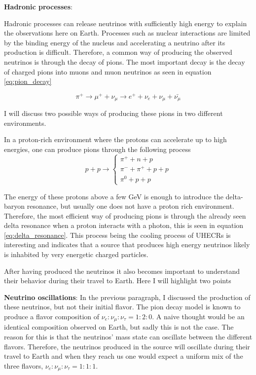 \textbf{Hadronic processes}:

Hadronic processes can release neutrinos with sufficiently high energy to explain the observations here on Earth. 
Processes such as nuclear interactions are limited by the binding energy of the nucleus and accelerating a neutrino after its production is difficult.
Therefore, a common way of producing the observed neutrinos is through the decay of pions. The most important decay is the decay of charged pions into muons and muon neutrinos as seen in equation \ref{eq:pion_decay}


\begin{equation}
    \pi^+ \rightarrow \mu^+ + \nu_\mu \rightarrow e^+ + \nu_e + \nu_\mu + \bar{\nu_\mu}
    \label{eq:pion_decay}
\end{equation}

I will discuss two possible ways of producing these pions in two different environments. 


In a proton-rich environment where the protons can accelerate up to high energies, one can produce pions through the following process
\begin{equation}
    p + p \rightarrow \begin{cases}
        \pi^+ + n+ p \\
        \pi^- + \pi^+ +p + p  \\
        \pi^0 + p+p
    \end{cases}
\end{equation}

The energy of these protons above a few GeV is enough to introduce the delta-baryon resonance, but usually one does not have a proton rich environment.
Therefore, the most efficient way of producing pions is through the already seen delta resonance when a proton interacts with a photon, this is seen in equation \ref{eq:delta_resonance}.
This process being the cooling process of UHECRs is interesting and indicates that a source that produces high energy neutrinos likely is inhabited by very energetic charged particles. 

After having produced the neutrinos it also becomes important to understand their behavior during their travel to Earth. Here I will highlight two points


\textbf{Neutrino oscillations}:
In the previous paragraph, I discussed the production of these neutrinos, but not their initial flavor.
The pion decay model is known to produce a flavor composition of $\nu_e : \nu_\mu : \nu_\tau = 1:2:0$. 
A naive thought would be an identical composition observed on Earth, but sadly this is not the case. 
The reason for this is that the neutrinos' mass state can oscillate between the different flavors. Therefore, the neutrinos produced in the source will oscillate during their travel to Earth and when they reach us one would expect a 
uniform mix of the three flavors, $ \nu_e: \nu_\mu: \nu_\tau = 1:1:1$.


